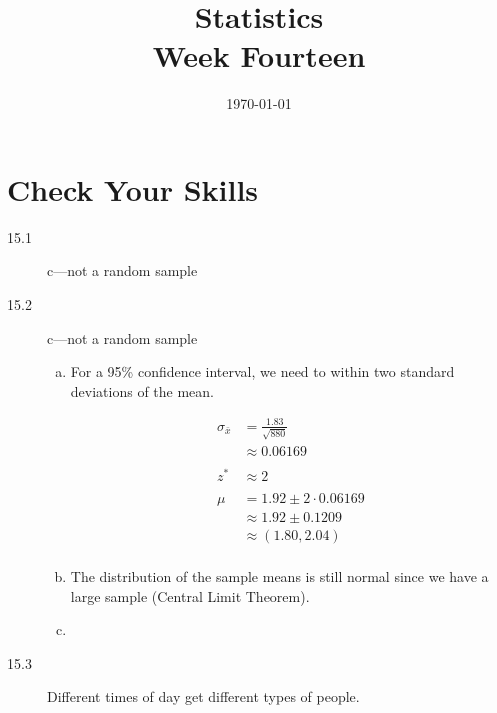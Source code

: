 \documentclass[landscape]{exam}
\title{Statistics \\ Week Fourteen}
\date{\today}
\author{}
\begin{document}
  \maketitle
  \tableofcontents

  \section{Check Your Skills}
  \begin{description}
    \item[15.1] c---not a random sample

    \item[15.2] c---not a random sample
      \begin{enumerate}[(a)]
        \item 
          For a 95\% confidence interval, we need to within two standard
          deviations of the mean.

          \begin{align*}
            \sigma_{\bar{x}} & = \frac{1.83}{\sqrt{880}} \\
                             & \approx 0.06169 \\
            \\
            z^* &\approx 2 \\
            \\
            \mu & = 1.92 \pm 2 \cdot 0.06169 \\
                & \approx 1.92 \pm 0.1209 \\
                & \approx (1.80, 2.04) \\
          \end{align*}

        \item The distribution of the sample means is still normal since we have
          a large sample (Central Limit Theorem).

        \item 
      \end{enumerate}

    \item[15.3] Different times of day get different types of people.


\end{description}
\end{document}
